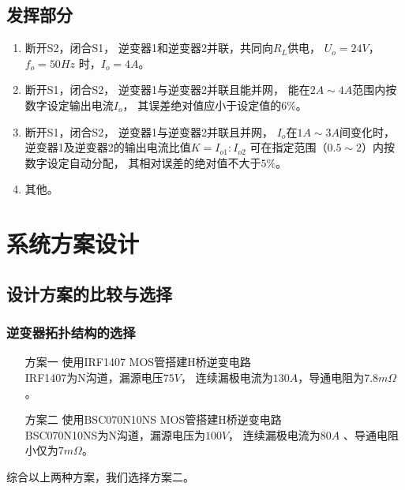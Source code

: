 \documentclass[a4paper,12pt]{article}
\begin{document}
\subsection{发挥部分}
\begin{enumerate}
    \item 断开S2，闭合S1，
    逆变器1和逆变器2并联，共同向$R_L$供电，
    $U_o=24V$， $f_o=50Hz$ 时，$I_o=4A$。
    \item 断开S1，闭合S2，
    逆变器1与逆变器2并联且能并网，
    能在$2A\sim4A$范围内按数字设定输出电流$I_o$，
    其误差绝对值应小于设定值的$6\%$。
    \item 断开S1，闭合S2，
    逆变器1与逆变器2并联且并网，
    $I_o$在$1A\sim 3A$间变化时，
    逆变器1及逆变器2的输出电流比值$K=I_{o1}:I_{o2}$
    可在指定范围（$0.5\sim 2$）内按数字设定自动分配，
    其相对误差的绝对值不大于$5\%$。
    \item 其他。
\end{enumerate}

\newpage

\section{系统方案设计}
\subsection{设计方案的比较与选择}

\subsubsection{逆变器拓扑结构的选择}
\begin{enumerate}
    \item[方案一] 使用IRF1407 MOS管搭建H桥逆变电路 
    \\ 
    IRF1407为N沟道，漏源电压$75V$，
    连续漏极电流为$130A$，导通电阻为$7.8m\Omega$。
    \item[方案二] 使用BSC070N10NS MOS管搭建H桥逆变电路 
    \\ 
    BSC070N10NS为N沟道，漏源电压为$100V$，
    连续漏极电流为$80A$ 、导通电阻小仅为$7m\Omega$。
\end{enumerate}
综合以上两种方案，我们选择方案二。
\end{document}
